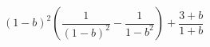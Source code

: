 \begin{ex}[type=expression]
	\begin{condition}
		\((1-b)^2\left( \dfrac{1}{(1-b)^2}-\dfrac{1}{1-b^2} \right)+\dfrac{3+b}{1+b}\)
	\end{condition}
\end{ex}